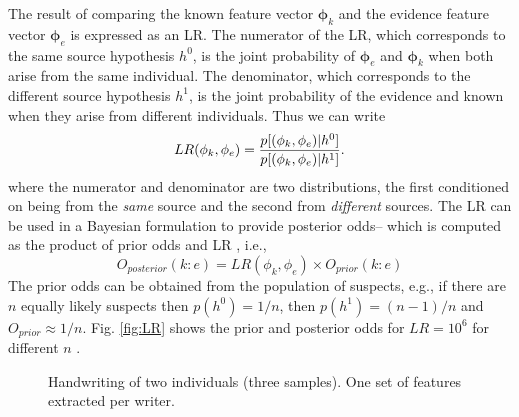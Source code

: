 \documentclass[11pt, doublespacing]{article}
\begin{document}
The result of comparing the known feature vector ${\mathbf{\phi}_k}$ and the evidence feature vector ${\mathbf \phi}_e$ is expressed as an LR.  
The numerator of the LR, which corresponds to  the same source hypothesis $h^0$,  is the joint probability of  ${\mathbf \phi}_e$ and ${\mathbf{\phi}_k}$ when both arise from the same individual. The denominator, which corresponds to the different source hypothesis $h^1$, is the  joint probability of the evidence and known when they arise from different individuals. Thus we can write
\begin{equation}
 LR(\phi_{k},\phi_{e})=\frac{p[({\bf \phi}_k,{\bf \phi}_e) | h^{0}]}{p[({\bf \phi}_k ,{\bf \phi}_e) | h^{1}]}.
\label{eq:LRJ}
\end{equation} 
where the numerator and denominator are  two distributions, the first conditioned on being  from the {\em same} source  and the second from  {\em different} sources.
The LR can be used in a Bayesian formulation to provide posterior odds-- which is computed as the product of prior odds and LR , i.e., 
\begin{equation}
O_{posterior}(k:e)=LR(\phi_{k},\phi_{e}) \times O_{prior}(k:e)
\label{eq:Odds}
\end{equation}
 The prior odds  can be obtained from the population of suspects, e.g., if there are $n$ equally likely suspects then $p(h^{0})=1/n$, then $p(h^{1})=(n-1)/n$ and $O_{prior} \approx 1/n$.  Fig. \ref{fig:LR} shows the prior and posterior odds for $LR=10^6$ for different  $n$ \cite{Taylor12}. 

\begin{figure}
\label{fig:th}
\centering
\hfill
{}
\caption{\small Handwriting of two individuals (three samples). One set of features extracted per writer. } 
\end{figure}
\end{document}
